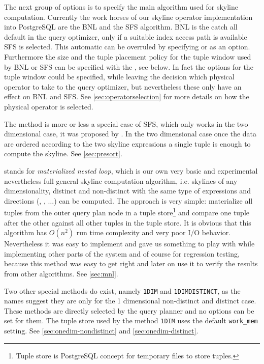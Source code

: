 The next group of options is to specify the main algorithm used for
skyline computation.
%
Currently the work horses of our skyline operator implementation into
PostgreSQL are the BNL and the SFS algorithm. BNL is the catch all
default in the query optimizer, %
only if a suitable index access path
is available SFS is selected. 
This automatic can be overruled by
specifying  or  as an option. Furthermore
the size and the tuple placement policy for the tuple window used by
BNL or SFS can be specified with the , see below.
In fact the options for the tuple window could be specified, while
leaving the decision which physical operator to take to the query
optimizer, but nevertheless these  only have an
effect on BNL and SFS. See \autoref{sec:operatorselection} for
more details on how the physical operator is selected.


The  method is more or less a special case of SFS,
which only works in the two dimensional case, it was proposed by 
\citet{Borzsonyi2001}. In the two dimensional case once the data
are ordered according to the two skyline expressions a single tuple is
enough to compute the skyline. See \autoref{sec:presort}.

 stands for \emph{materialized nested loop}, which
is our own very basic and experimental nevertheless full general
skyline computation algorithm, i.e. skylines of any dimensionality,
distinct and non-distinct with the same type of expressions and
directions (, , $\ldots$) can be
computed. The approach is very simple: materialize all tuples from the
outer query plan node in a tuple store\footnote{Tuple store is PostgreSQL concept for temporary files
to store tuples.} and compare one tuple after the other against all
other tuples in the tuple store. It is obvious that this algorithm has
$O(n^2)$ run time complexity and very poor I/O behavior. Nevertheless
it was easy to implement and gave us something to play with while
implementing other parts of the system and of course for regression
testing, because this method was easy to get right and later on
use it to verify the results from other algorithms. See
\autoref{sec:mnl}.

Two other special methods do exist, namely \texttt{1DIM} and
\texttt{1DIMDISTINCT}, as the names suggest they are only for the 1
dimensional non-distinct and distinct case.  These methods are
directly selected by the query planner and no options can be set for
them.  The tuple store used by the method \texttt{1DIM} uses the
default \texttt{work\_mem} setting. See
\autoref{sec:onedim-nondistinct} and
\autoref{sec:onedim-distinct}.

